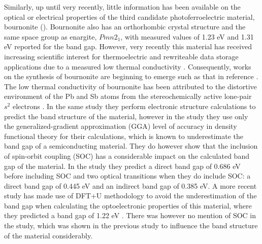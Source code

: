 Similarly, up until very recently, little information has been available on the optical or electrical properties of the third candidate photoferroelectric material, bournonite (\bournonite). Bournonite also has an orthorhombic crystal structure and the same space group as enargite,  $Pmn2_1$, with measured values of 1.23 eV \cite{Dittrich1} and 1.31 eV \cite{bournonite} reported for the band gap. However, very recently this material has received increasing scientific interest for thermoelectric and rewriteable data storage applications due to a measured low thermal conductivity \cite{Dong}. 
Consequently, works on the synthesis of bournonite are beginning to emerge such as that in reference .
The low thermal conductivity of bournonite has been attributed to the distortive environment of the Pb and Sb atoms from the stereochemically active lone-pair $s^2$ electrons \cite{Dong}. In the same study they perform electronic structure calculations to predict the band structure of the material, however in the study they use only the generalized-gradient approximation (GGA) level of accuracy in density functional theory for their calculations, which is known to underestimate the band gap of a semiconducting material. They do however show that the inclusion of spin-orbit coupling (SOC) has a considerable impact on the calculated band gap of the material. In the study they predict a direct band gap of 0.686 eV before including SOC and two optical transitions when they do include SOC: a direct band gap of 0.445 eV and an indirect band gap of 0.385 eV. 
A more recent study has made use of DFT+U methodology to avoid the underestimation of the band gap when calculating the optoelectronic properties of this material, where they predicted a band gap of 1.22 eV \cite{bournonite_new}. There was however no mention of SOC in the study, which was shown in the previous study to influence the band structure of the material considerably.

